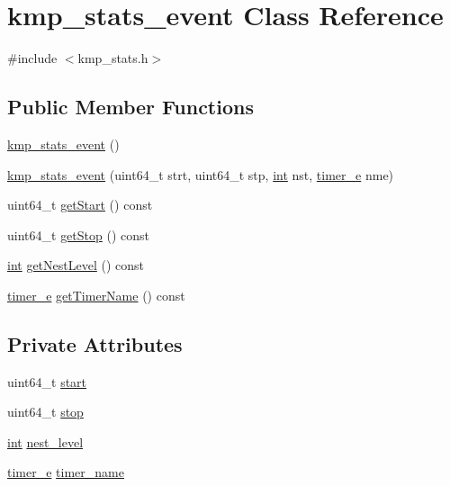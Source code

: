 \hypertarget{classkmp__stats__event}{\section{kmp\-\_\-stats\-\_\-event Class Reference}
\label{classkmp__stats__event}
}


{\ttfamily \#include $<$kmp\-\_\-stats.\-h$>$}

\subsection*{Public Member Functions}
\begin{DoxyCompactItemize}
\item 
\hyperlink{classkmp__stats__event_a37d226a15e672d6934bf267fa7081a9c}{kmp\-\_\-stats\-\_\-event} ()
\item 
\hyperlink{classkmp__stats__event_a6a9b055d6eb02a2dc798574c3c3e53cc}{kmp\-\_\-stats\-\_\-event} (uint64\-\_\-t strt, uint64\-\_\-t stp, \hyperlink{ittnotify__static_8h_a8b8dcd723308a8cb5d84277c7a3fff70}{int} nst, \hyperlink{kmp__stats_8h_ae03f1e0ff609f86afa9b7167a12c6c06}{timer\-\_\-e} nme)
\item 
uint64\-\_\-t \hyperlink{classkmp__stats__event_acc3ddb03443fbc33aa998b7cc7a45e1b}{get\-Start} () const 
\item 
uint64\-\_\-t \hyperlink{classkmp__stats__event_ad0be59af5a8326d2763d24a593981bb7}{get\-Stop} () const 
\item 
\hyperlink{ittnotify__static_8h_a8b8dcd723308a8cb5d84277c7a3fff70}{int} \hyperlink{classkmp__stats__event_a3ad479ae63c480045a30b486d560bcd0}{get\-Nest\-Level} () const 
\item 
\hyperlink{kmp__stats_8h_ae03f1e0ff609f86afa9b7167a12c6c06}{timer\-\_\-e} \hyperlink{classkmp__stats__event_afe49e1ae5923b06c20666919783ceaf1}{get\-Timer\-Name} () const 
\end{DoxyCompactItemize}
\subsection*{Private Attributes}
\begin{DoxyCompactItemize}
\item 
uint64\-\_\-t \hyperlink{classkmp__stats__event_aa014a405577493c27743ec39a2b9ea2a}{start}
\item 
uint64\-\_\-t \hyperlink{classkmp__stats__event_a2a06a18d642394884c62461530dd4e68}{stop}
\item 
\hyperlink{ittnotify__static_8h_a8b8dcd723308a8cb5d84277c7a3fff70}{int} \hyperlink{classkmp__stats__event_ac2650266ee0040f60d5145d6b9c7fdd9}{nest\-\_\-level}
\item 
\hyperlink{kmp__stats_8h_ae03f1e0ff609f86afa9b7167a12c6c06}{timer\-\_\-e} \hyperlink{classkmp__stats__event_afd16631d13a4b9a3bcf40e758c182c8b}{timer\-\_\-name}
\end{DoxyCompactItemize}



